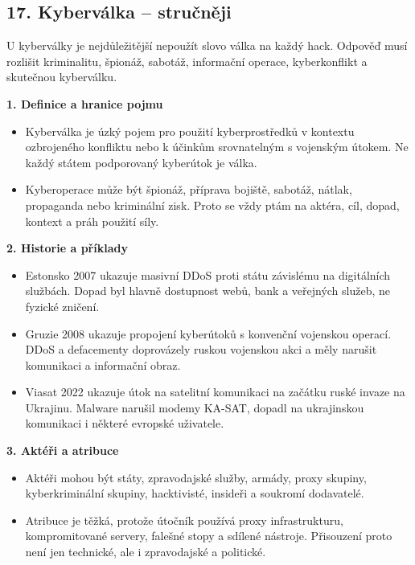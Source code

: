 
\subsection*{17. Kyberválka -- stručněji}
U kyberválky je nejdůležitější nepoužít slovo válka na každý hack. Odpověď musí rozlišit kriminalitu, špionáž, sabotáž, informační operace, kyberkonflikt a skutečnou kyberválku.

\textbf{1. Definice a hranice pojmu}
\begin{itemize}
  \item Kyberválka je úzký pojem pro použití kyberprostředků v kontextu ozbrojeného konfliktu nebo k účinkům srovnatelným s vojenským útokem. Ne každý státem podporovaný kyberútok je válka.
  \item Kyberoperace může být špionáž, příprava bojiště, sabotáž, nátlak, propaganda nebo kriminální zisk. Proto se vždy ptám na aktéra, cíl, dopad, kontext a práh použití síly.
\end{itemize}

\textbf{2. Historie a příklady}
\begin{itemize}
  \item Estonsko 2007 ukazuje masivní DDoS proti státu závislému na digitálních službách. Dopad byl hlavně dostupnost webů, bank a veřejných služeb, ne fyzické zničení.
  \item Gruzie 2008 ukazuje propojení kyberútoků s konvenční vojenskou operací. DDoS a defacementy doprovázely ruskou vojenskou akci a měly narušit komunikaci a informační obraz.
  \item Viasat 2022 ukazuje útok na satelitní komunikaci na začátku ruské invaze na Ukrajinu. Malware narušil modemy KA-SAT, dopadl na ukrajinskou komunikaci i některé evropské uživatele.
\end{itemize}

\textbf{3. Aktéři a atribuce}
\begin{itemize}
  \item Aktéři mohou být státy, zpravodajské služby, armády, proxy skupiny, kyberkriminální skupiny, hacktivisté, insideři a soukromí dodavatelé.
  \item Atribuce je těžká, protože útočník používá proxy infrastrukturu, kompromitované servery, falešné stopy a sdílené nástroje. Přisouzení proto není jen technické, ale i zpravodajské a politické.
\end{itemize}

